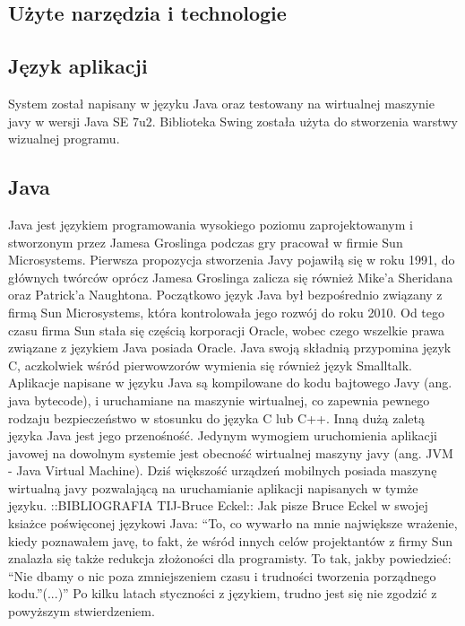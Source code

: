 \subsection{Użyte narzędzia i technologie}
\begin{par}
	\subsection{Język aplikacji}
	System został napisany w języku Java oraz testowany na wirtualnej maszynie javy w wersji Java SE 7u2. Biblioteka Swing została użyta do stworzenia warstwy wizualnej programu.
	\subsection{Java}
	Java jest językiem programowania wysokiego poziomu zaprojektowanym i stworzonym przez Jamesa Groslinga podczas gry pracował w firmie Sun Microsystems. Pierwsza propozycja stworzenia Javy pojawiłą się w roku 1991, do głównych twórców oprócz Jamesa Groslinga zalicza się również Mike'a Sheridana oraz Patrick'a Naughtona.
	Początkowo język Java był bezpośrednio związany z firmą Sun Microsystems, która kontrolowała jego rozwój do roku 2010.
	Od tego czasu firma Sun stała się częścią korporacji Oracle, wobec czego wszelkie prawa związane z językiem Java posiada Oracle.
	Java swoją składnią przypomina język C, aczkolwiek wśród pierwowzorów wymienia się również język Smalltalk.
	Aplikacje napisane w języku Java są kompilowane do kodu bajtowego Javy (ang. java bytecode), i uruchamiane na maszynie wirtualnej, co zapewnia pewnego rodzaju bezpieczeństwo w stosunku do języka C lub C++.
	Inną dużą zaletą języka Java jest jego przenośność.
	Jedynym wymogiem uruchomienia aplikacji javowej na dowolnym systemie jest obecność wirtualnej maszyny javy (ang. JVM - Java Virtual Machine).
	Dziś większość urządzeń mobilnych posiada maszynę wirtualną javy pozwalającą na uruchamianie aplikacji napisanych w tymże języku.
	::BIBLIOGRAFIA TIJ-Bruce Eckel::
	Jak pisze Bruce Eckel w swojej ksiażce poświęconej językowi Java: ``To, co wywarło na mnie największe wrażenie, kiedy poznawałem javę, to fakt, że wśród innych celów projektantów z firmy Sun znalazła się także redukcja złożoności dla programisty. 
	To tak, jakby powiedzieć: ``Nie dbamy o nic poza zmniejszeniem czasu i trudności tworzenia porządnego kodu.''(...)''
	Po kilku latach styczności z językiem, trudno jest się nie zgodzić z powyższym stwierdzeniem.

\end{par}
